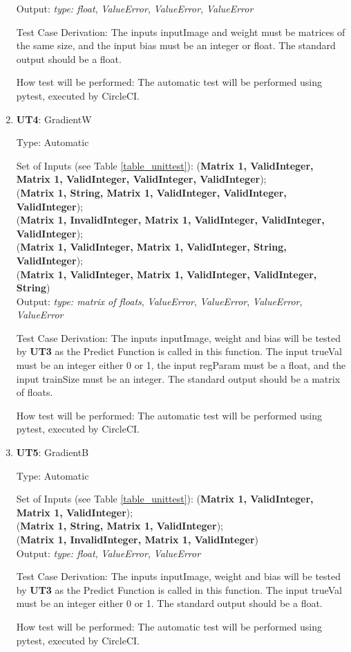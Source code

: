 \documentclass[12pt, titlepage]{article}
\begin{document}
\begin{enumerate}
Output: \textit{type: float}, \textit{ValueError}, \textit{ValueError}, \textit{ValueError}

Test Case Derivation: The inputs inputImage and weight must be matrices of the same size, and the input bias must be an integer or float. The standard output should be a float.

How test will be performed: The automatic test will be performed using pytest, executed by CircleCI.

\item{\textbf{UT4}: GradientW}

Type: Automatic
					
Set of Inputs (see Table \ref{table_unittest}): (\textbf{Matrix 1, ValidInteger, Matrix 1, ValidInteger, ValidInteger, ValidInteger});\\
(\textbf{Matrix 1, String, Matrix 1, ValidInteger, ValidInteger, ValidInteger});\\
(\textbf{Matrix 1, InvalidInteger, Matrix 1, ValidInteger, ValidInteger, ValidInteger});\\
(\textbf{Matrix 1, ValidInteger, Matrix 1, ValidInteger, String, ValidInteger});\\
(\textbf{Matrix 1, ValidInteger, Matrix 1, ValidInteger, ValidInteger, String})\\
					
Output: \textit{type: matrix of floats}, \textit{ValueError}, \textit{ValueError}, \textit{ValueError}, \textit{ValueError}

Test Case Derivation: The inputs inputImage, weight and bias will be tested by \textbf{UT3} as the Predict Function is called in this function. 
The input trueVal must be an integer either 0 or 1, the input regParam must be a float, and the input trainSize must be an integer. The standard output
should be a matrix of floats.

How test will be performed: The automatic test will be performed using pytest, executed by CircleCI.

\item{\textbf{UT5}: GradientB}

Type: Automatic
					
Set of Inputs (see Table \ref{table_unittest}): (\textbf{Matrix 1, ValidInteger, Matrix 1, ValidInteger});\\
(\textbf{Matrix 1, String, Matrix 1, ValidInteger});\\
(\textbf{Matrix 1, InvalidInteger, Matrix 1, ValidInteger})\\
					
Output: \textit{type: float}, \textit{ValueError}, \textit{ValueError}

Test Case Derivation: The inputs inputImage, weight and bias will be tested by \textbf{UT3} as the Predict Function is called in this function. 
The input trueVal must be an integer either 0 or 1. The standard output should be a float.

How test will be performed: The automatic test will be performed using pytest, executed by CircleCI.
\end{enumerate}
\end{document}
